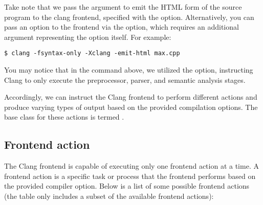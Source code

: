 Take note that we pass the argument to emit the HTML form of the source program
to the clang frontend, specified with the  option. Alternatively,
you can pass an option to the frontend via the  option, which
requires an additional argument representing the option itself. For example: 

\begin{adjustwidth}{0em}{0em}
\begin{verbatim}
$ clang -fsyntax-only -Xclang -emit-html max.cpp
\end{verbatim}
\end{adjustwidth}

You may notice that in the command above, we utilized the
 option, instructing Clang to only execute the
preprocessor, parser, and semantic analysis stages. 

Accordingly, we can instruct the Clang frontend to perform different actions and
produce varying types of output based on the provided compilation options. The
base class for these actions is termed . 

\subsection{Frontend action}
\label{sec:frontend_action}
The Clang frontend is capable of executing only one frontend action at a time. A
frontend action is a specific task or process that the frontend performs based
on the provided compiler option. Below is a list of some possible frontend
actions (the table only includes a subset of the available frontend actions): 

\begin{table}[htbp]
\centering
{}
\caption{Frontend actions}
\label{tbl:frontend_actions}
\end{table}

